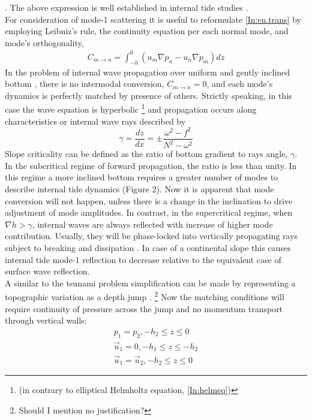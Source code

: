 \documentclass[12pt]{article}
\begin{document}
\citep{kelly2012cascade}. The above expression is well established in internal tide studies 
\citep{kurapov2003m, llewellyn2002conversion, pickering2015structure}.\\
For consideration of mode-1 scattering it is useful to reformulate \eqref{In:en.trans} by employing 
Leibniz's rule, the continuity equation per each normal mode, and mode's orthogonality,
\begin{align}
\label{In:bc_bc}
C_{m \to n} = \int_{-h}^{0} (u_m \nabla p_n - u_n \nabla p_m) dz
\end{align}
In the problem of internal wave propagation over uniform and gently inclined bottom 
\citep{wunsch1968propagation}, there is no intermodal conversion, $C_{m \to n} = 0$, and each 
mode's dynamics is perfectly matched by presence of others. Strictly speaking, in this case the 
wave equation is hyperbolic \footnote{(in contrary to elliptical Helmholtz equation, 
\eqref{In:helmeq})} and propagation occurs along characteristics \citep{sandstrom1969effect} or 
internal wave rays described by
\begin{equation}
\label{In:ch.angle}
\gamma = \frac{dz}{dx} = \pm \frac{\omega^2 - f^2}{N^2 - \omega^2}
\end{equation}
Slope criticality can be defined as the ratio of bottom gradient to rays angle, $\gamma$. In the 
subcritical regime of forward propagation, the ratio is less than unity. In this regime a more 
inclined bottom requires a greater number of modes to describe internal tide dynamics (Figure 
2). Now it is apparent that mode conversion will not happen, unless there is a change in the 
inclination to drive adjustment of mode amplitudes. In contrast, in the supercritical regime, when 
$\nabla h > \gamma$, internal waves are always reflected with increase of higher mode contribution. 
Usually, they will be phase-locked into vertically propagating rays \citep{garrett2007internal, 
lamb2014internal} subject to breaking and dissipation \citep{lien2001observations, 
nash2004internal, klymak2011breaking}. In case of a continental slope this causes internal tide 
mode-1 reflection to decrease relative to the equivalent case of surface wave reflection.\\
A similar to the tsunami problem simplification can be made by representing a topographic variation 
as a depth jump \citep{st2002role, larsen1969internal, chapman1981scattering}. \footnote{Should I 
mention no justification?} Now the matching conditions will require continuity of pressure across 
the jump and no momentum transport through vertical walls:
\begin{align}
p_1 = p_2, -h_2 \leq z \leq 0 \\
\vec{u}_1 = 0, -h_1 \leq z \leq -h_2\\
\vec{u}_1 = \vec{u}_2, -h_2 \leq z \leq 0
\end{align}
\end{document}
